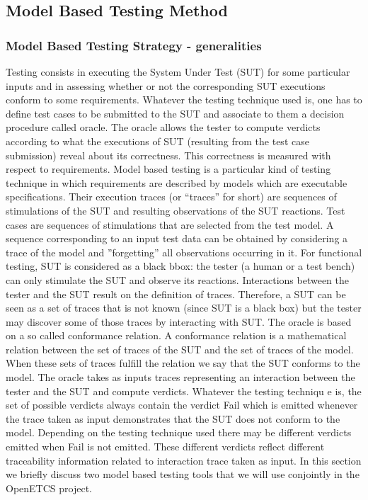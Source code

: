 \documentclass{template/openetcs_report}
\begin{document}
\subsection{Model Based Testing Method}
\label{subsec:mbt}
\subsubsection{Model Based Testing Strategy - generalities}
Testing consists in executing the System Under Test (SUT)
 for some particular inputs and in assessing whether or not the
 corresponding SUT executions conform to some requirements.
 Whatever the testing technique used is, one has to define test cases
 to be submitted to the SUT and associate to them a decision procedure
 called oracle. The oracle allows the tester to compute verdicts according 
to what the executions of SUT (resulting from the test case submission) 
reveal about its correctness.
This correctness is measured with respect to requirements. Model based
 testing is a particular kind of testing technique in which requirements are 
described by models which are executable specifications. Their execution
 traces (or ``traces'' for short) are sequences of stimulations of the SUT and
 resulting observations of the SUT reactions. Test cases are sequences of 
stimulations that are selected from the test model. A sequence corresponding
 to an input test data can be obtained by considering a trace of the model and
 ”forgetting” all observations occurring in it. For functional testing, SUT is 
considered as a black bbox: the tester (a human or a test bench) can only
 stimulate the SUT and observe its reactions. Interactions between the tester
 and the SUT result on the definition of traces. Therefore, a SUT can be seen
 as a set of traces that is not known (since SUT is a black box) but the tester
 may discover some of those traces by interacting with SUT. The oracle is based
 on a so called conformance relation. A conformance relation is a mathematical
 relation between the set of traces of the SUT and the set of traces of the model.
 When these sets of traces fulfill the relation we say that the SUT conforms to 
the model. The oracle takes as inputs traces representing an interaction between
 the tester and the SUT and compute verdicts. Whatever the testing techniqu
e is, the set of possible verdicts always contain the verdict Fail which is emitted 
whenever the trace taken as input demonstrates that the SUT does not conform 
to the model. Depending on the testing technique used there may be different 
verdicts emitted when Fail is not emitted. These different verdicts reflect different
 traceability information related to interaction trace taken as input. In this section
 we briefly discuss two model based testing tools that we will use conjointly in the 
OpenETCS project.
\end{document}
